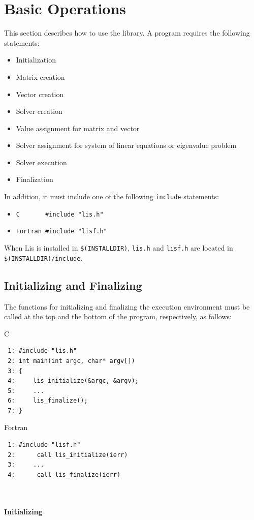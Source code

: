 \documentclass[a4paper]{article}
\begin{document}
\newpage
\section{Basic Operations}
This section describes how to use the library. 
A program requires the following statements:
\begin{itemize}
\item Initialization
\item Matrix creation
\item Vector creation
\item Solver creation
\item Value assignment for matrix and vector
\item Solver assignment for system of linear equations or eigenvalue problem
\item Solver execution
\item Finalization
\end{itemize}
In addition, it must include one of the following {\tt include} statements: 
\begin{itemize}
\item \verb+C       #include "lis.h"+
\item \verb+Fortran #include "lisf.h"+
\end{itemize}
When Lis is installed in \verb|$(INSTALLDIR)|, {\tt lis.h} and {\tt lisf.h} are 
located in \verb|$(INSTALLDIR)/include|.
\newpage
\subsection{Initializing and Finalizing}
The functions for initializing and finalizing the execution environment 
must be called at the top and the bottom of the program, respectively, as follows:
\begin{itembox}[l]{C}
\small
\begin{verbatim}
 1: #include "lis.h"
 2: int main(int argc, char* argv[])
 3: {
 4:     lis_initialize(&argc, &argv);
 5:     ...
 6:     lis_finalize();
 7: }
\end{verbatim}
\end{itembox}
\begin{itembox}[l]{Fortran}
\small
\begin{verbatim}
 1: #include "lisf.h"
 2:      call lis_initialize(ierr) 
 3:     ...
 4:      call lis_finalize(ierr)
\end{verbatim}
\end{itembox}
\\ \\
\noindent
{\bf Initializing}
\end{document}
